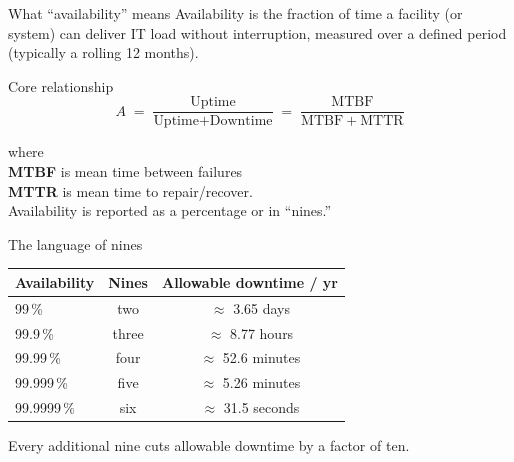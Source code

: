 \begin{frame}{What ``availability'' means}
  Availability is the fraction of time a facility (or system) can deliver IT load
  without interruption, measured over a defined period (typically a rolling 12 months).

  \vspace{0.6em}
  \begin{block}{Core relationship}
    \[
      A \;=\; \frac{\text{Uptime}}{\text{Uptime}+\text{Downtime}}
        \;=\; \frac{\mathrm{MTBF}}{\mathrm{MTBF}+\mathrm{MTTR}}
    \]
  \end{block}
  \vspace{0.3em}
  where\\ 
  \quad\textbf{MTBF} is mean time between failures\\
  \quad\textbf{MTTR} is mean time to repair/recover.\\
  \vspace{1em}
  Availability is reported as a percentage or in ``nines.''
\end{frame}

\begin{frame}{The language of nines}
  \centering
  \renewcommand{\arraystretch}{1.25}
  \begin{tabular}{lcc}
    \toprule
    \textbf{Availability} & \textbf{Nines} & \textbf{Allowable downtime / yr} \\
    \midrule
    99\,\%      & two   & $\approx$ 3.65 days   \\
    99.9\,\%    & three & $\approx$ 8.77 hours  \\
    99.99\,\%   & four  & $\approx$ 52.6 minutes\\
    99.999\,\%  & five  & $\approx$ 5.26 minutes\\
    99.9999\,\% & six   & $\approx$ 31.5 seconds\\
    \bottomrule
  \end{tabular}

  \vspace{1em}
  \small Every additional nine cuts allowable downtime by a factor of ten.
\end{frame}

